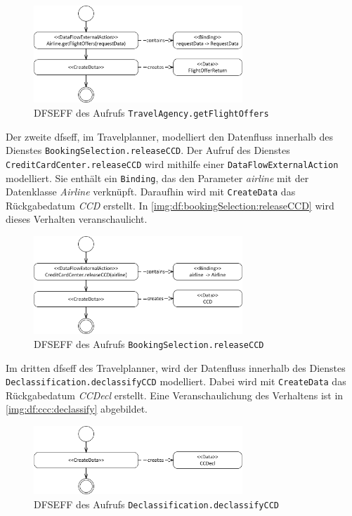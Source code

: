 \begin{figure}[h]
	\centering
  	\includegraphics[width=0.7\textwidth]{images/dfseff_TA_getFlight.png}
	\caption{DFSEFF des Aufrufs \texttt{TravelAgency.getFlightOffers}}
	\label{img:df:ta:getFlight}
\end{figure} 
Der zweite \gls{dfseff}, im Travelplanner, modelliert den Datenfluss innerhalb des Dienstes \texttt{BookingSelection.releaseCCD}. Der Aufruf des Dienstes \texttt{CreditCardCenter.releaseCCD} wird mithilfe einer \texttt{DataFlowExternalAction} modelliert. Sie enthält ein \texttt{Binding}, das den Parameter \textit{airline} mit der Datenklasse \textit{Airline} verknüpft. Daraufhin wird mit \texttt{CreateData} das Rückgabedatum \textit{CCD} erstellt. In \autoref{img:df:bookingSelection:releaseCCD} wird dieses Verhalten veranschaulicht. \par
\begin{figure}[h]
	\centering
  	\includegraphics[width=0.7\textwidth]{images/dfseff_bookingSelection_releaseCCD.png}
	\caption{DFSEFF des Aufrufs \texttt{BookingSelection.releaseCCD}}
	\label{img:df:bookingSelection:releaseCCD}
\end{figure}
Im dritten \gls{dfseff} des Travelplanner, wird der Datenfluss innerhalb des Dienstes \\\texttt{Declassification.declassifyCCD} modelliert. Dabei wird mit \texttt{CreateData} das Rückgabedatum \textit{CCDecl} erstellt. Eine Veranschaulichung des Verhaltens ist in \autoref{img:df:ccc:declassify} abgebildet. \par
\begin{figure}[h]
	\centering
  	\includegraphics[width=0.7\textwidth]{images/dfseff_CCC_declassify.png}
	\caption{DFSEFF des Aufrufs \texttt{Declassification.declassifyCCD}}
	\label{img:df:ccc:declassify}
\end{figure}
